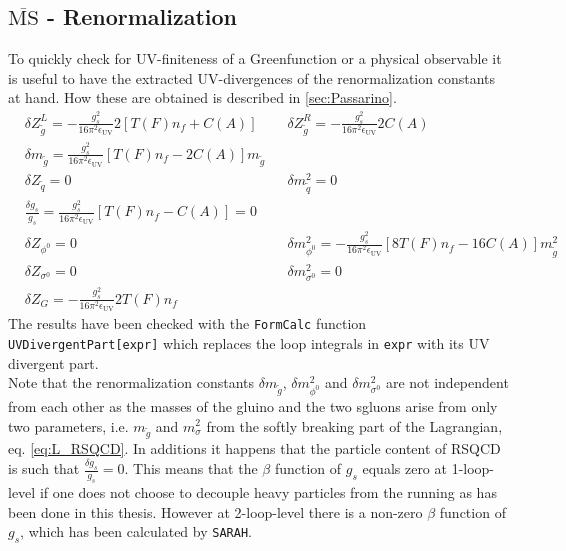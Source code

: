 \subsection{$\overline{\mathrm{MS}}$ - Renormalization}\label{sec:MSRen}
To quickly check for UV-finiteness of a Greenfunction or a physical observable it is useful to have the extracted UV-divergences of the renormalization constants at hand. How these are obtained is described in \ref{sec:Passarino}.
\begin{align}
& \delta Z_{\tilde{g}}^L = -\frac{g_s^2}{16\pi^2\epsilon_{\mathrm{UV}}} 2\left[ T(F) n_f + C(A) \right] &&  \delta Z_{\tilde{g}}^R = -\frac{g_s^2}{16\pi^2\epsilon_{\mathrm{UV}}} 2 C(A)\nonumber\\
& \delta m_{\tilde{g}} = \frac{g_s^2}{16\pi^2\epsilon_{\mathrm{UV}}} \left[ T(F) n_f - 2C(A) \right] m_{\tilde{g}}\nonumber\\
& \delta Z_{\tilde{q}} = 0 && \delta m_{\tilde{q}}^2 = 0\nonumber\\
&\frac{\delta g_s}{g_s} = \frac{g_s^2}{16\pi^2\epsilon_{\mathrm{UV}}}\left[ T(F) n_f - C(A) \right] = 0\nonumber\\
& \delta Z_{\phi^0} = 0 && \delta m_{\phi^0}^2 = -\frac{g_s^2}{16\pi^2\epsilon_{\mathrm{UV}}}\left[ 8T(F)n_f - 16C(A) \right]m_{\tilde{g}}^2\nonumber\\
& \delta Z_{\sigma^0} = 0 && \delta m_{\sigma^0}^2 = 0\nonumber\\
& \delta Z_{G} = -\frac{g_s^2}{16\pi^2\epsilon_{\mathrm{UV}}} 2T(F) n_f
\end{align}
The results have been checked with the \texttt{FormCalc} function \texttt{UVDivergentPart[expr]} which replaces the loop integrals in \texttt{expr} with its UV divergent part.\\
Note that the renormalization constants $\delta m_{\tilde{g}}$, $\delta m^2_{\phi^0}$ and $\delta m^2_{\sigma^0}$ are not independent from each other as the masses of the gluino and the two sgluons arise  from only two parameters, i.e. $m_{\tilde{g}}$ and $m_{\sigma}^2$ from the softly breaking part of the Lagrangian, eq. \eqref{eq:L_RSQCD}. 
In additions it happens that the particle content of RSQCD is such that $\frac{\delta g_s}{g_s} = 0$. This means that the $\beta$ function of $g_s$ equals zero at 1-loop-level if one does not choose to decouple heavy particles from the running as has been done in this thesis. However at 2-loop-level there is a non-zero $\beta$ function of $g_s$, which has been calculated by \texttt{SARAH}.



